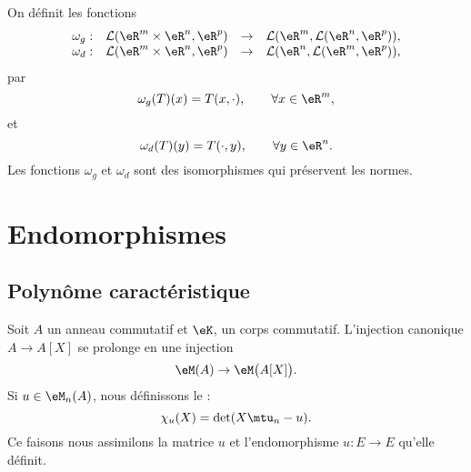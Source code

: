 \begin{proposition}\label{isom_isom}
  On définit les fonctions
  \begin{equation}
    \begin{array}{rccc}
      \omega_g: & \mathcal{L}(\eR^{m}\times\eR^{n}, \eR^p)&\to &\mathcal{L}(\eR^{m}, \mathcal{L}(\eR^{n}, \eR^p)),\\
      \omega_d: & \mathcal{L}(\eR^{m}\times\eR^{n}, \eR^p)&\to &\mathcal{L}(\eR^{n}, \mathcal{L}(\eR^{m}, \eR^p)),
    \end{array}
  \end{equation}
par 
\[
\omega_g(T)(x)=T(x,\cdot), \qquad \forall x\in\eR^m,
\]
et
\[
\omega_d(T)(y)=T(\cdot, y), \qquad \forall y\in\eR^n.
\]
Les fonctions $\omega_g$ et $\omega_d$ sont des isomorphismes qui préservent les normes.    
\end{proposition}




\section{Endomorphismes}

\subsection{Polynôme caractéristique}

Soit \( A\) un anneau commutatif et \( \eK\), un corps commutatif. L'injection canonique \( A\to A[X]\) se prolonge en une injection
\begin{equation}
   \eM(A)\to\eM\big( A[X] \big).
\end{equation}
Si \( u\in\eM_n(A)\), nous définissons le  :
\begin{equation}    \label{Eqkxbdfu}
    \chi_u(X)=\det(X\mtu_n-u).
\end{equation} 
Ce faisons nous assimilons la matrice \( u\) et l'endomorphisme \( u\colon E\to E\) qu'elle définit. 


